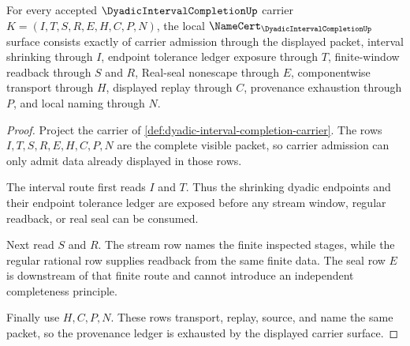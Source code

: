 \begin{theorem}
\label{thm:dyadic-interval-completion-namecert-obligations}
For every accepted $\DyadicIntervalCompletionUp$ carrier $K=(I,T,S,R,E,H,C,P,N)$, the local $\NameCert_{\DyadicIntervalCompletionUp}$ surface consists exactly of carrier admission through the displayed packet, interval shrinking through $I$, endpoint tolerance ledger exposure through $T$, finite-window readback through $S$ and $R$, Real-seal nonescape through $E$, componentwise transport through $H$, displayed replay through $C$, provenance exhaustion through $P$, and local naming through $N$.
\end{theorem}
\begin{proof}
Project the carrier of \autoref{def:dyadic-interval-completion-carrier}. The rows $I,T,S,R,E,H,C,P,N$ are the complete visible packet, so carrier admission can only admit data already displayed in those rows.

The interval route first reads $I$ and $T$. Thus the shrinking dyadic endpoints and their endpoint tolerance ledger are exposed before any stream window, regular readback, or real seal can be consumed.

Next read $S$ and $R$. The stream row names the finite inspected stages, while the regular rational row supplies readback from the same finite data. The seal row $E$ is downstream of that finite route and cannot introduce an independent completeness principle.

Finally use $H,C,P,N$. These rows transport, replay, source, and name the same packet, so the provenance ledger is exhausted by the displayed carrier surface.
\end{proof}

